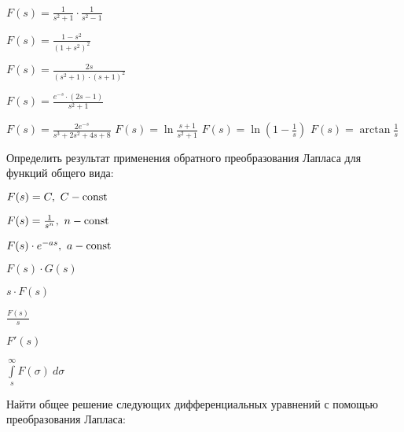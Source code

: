 	\vspace{10pt}

	\begin{multicols}{3}
		\begin{enumtasks}
			
			\item \( F(s) = \frac{1}{s^2 + 1} \cdot \frac{1}{s^2 - 1} \)
			\item \( F(s) = \frac{1 - s^2}{\left( 1 + s^2 \right)^2} \)
			\item \( F(s) = \frac{2s}{\left( s^2 + 1 \right) \cdot \left( s + 1 \right)^2} \)
			\item \( F(s) = \frac{e^{-s} \cdot \left( 2s - 1 \right)}{s^2 + 1} \)
			\item \( F(s) = \frac{2e^{-s}}{s^3 + 2s^2 + 4s + 8} \)
			\itemstar \( F(s) = \ln \frac{s+1}{s^2 + 1} \)
			\itemstar \( F(s) = \ln\left( 1 - \frac{1}{s} \right) \)
			\itemstar \( F(s) = \arctan{\frac{1}{s}} \)

		\end{enumtasks}
	\end{multicols}

	\vspace{15pt}

	Определить результат применения обратного преобразования Лапласа для функций общего вида:

	\begin{multicols}{3}
		\begin{enumtasks}

			\item \( F(s) = C, ~ C - \mathrm{const} \)
			\item \( F(s) = \frac{1}{s^n}, ~ n - \mathrm{const} \)
			\item \( F(s) \cdot e^{-as}, ~ a - \mathrm{const} \)
			\item \( F(s) \cdot G(s) \)
			\item \( s \cdot F(s) \)	%
			\item \( \frac{F(s)}{s} \) %
			\item \( F'(s) \)	%
			\item \( \int\limits_{s}^{\infty} F(\sigma) ~ d\sigma \) %

		\end{enumtasks}
	\end{multicols}

	\vspace{15pt}

	Найти общее решение следующих дифференциальных уравнений с помощью преобразования Лапласа:

